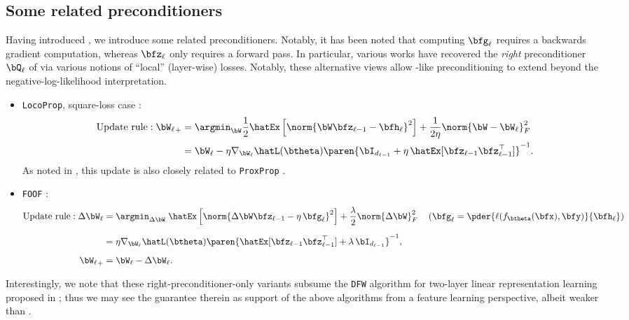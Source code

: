 \subsection*{Some related preconditioners}
Having introduced \KFAC, we introduce some related preconditioners. Notably, it has been noted that computing $\bfg_\ell$ requires a backwards gradient computation, whereas $\bfz_\ell$ only requires a forward pass. In particular, various works have recovered the \emph{right} preconditioner $\bQ_\ell$ of \KFAC via various notions of ``local'' (layer-wise) losses. Notably, these alternative views allow \KFAC-like preconditioning to extend beyond the negative-log-likelihood interpretation.
\begin{itemize}
    \item \texttt{LocoProp}, square-loss case \cite{amid2022locoprop}:
    \begin{align*}
        \text{Update rule}: {\bW_{\ell}}_+ &= \argmin_{\bW} \frac{1}{2}\hatEx\left[\norm{\bW \bfz_{\ell-1} - \bfh_\ell}^2\right] + \frac{1}{2\eta}\norm{\bW - \bW_\ell}_F^2 \\
        &= \bW_\ell - \eta \nabla_{\bW_\ell} \hatL(\btheta)\paren{\bI_{d_{\ell-1}} + \eta \,\hatEx[\bfz_{\ell-1} \bfz_{\ell-1}^\top]}^{-1}.
    \end{align*}
    As noted in \citet{amid2022locoprop}, this update is also closely related to \texttt{ProxProp} \cite{frerix2018proximal}.

    \item \texttt{FOOF} \cite{benzing2022gradient}:
    \begin{align*}
        \text{Update rule}: \Delta \bW_\ell &= \argmin_{\Delta \bW}\;\hatEx \left[\norm{\Delta \bW \bfz_{\ell-1} - \eta\, \bfg_\ell}^2\right] + \frac{\lambda}{2} \norm{\Delta \bW}_F^2 && \left(\bfg_\ell = \pder{\ell(f_{\btheta}(\bfx), \bfy)}{\bfh_\ell}\right) \\[0.2cm]
        &= \eta \nabla_{\bW_\ell} \hatL(\btheta) \paren{\hatEx[\bfz_{\ell-1} \bfz_{\ell-1}^\top] + \lambda\, \bI_{d_{\ell-1}}}^{-1}, \\[0.2cm]
        {\bW_{\ell}}_+ &= \bW_\ell - \Delta \bW_\ell.
    \end{align*}
\end{itemize}
Interestingly, we note that these right-preconditioner-only variants subsume the \texttt{DFW} algorithm for two-layer linear representation learning proposed in \citet{zhang2023meta}; thus we may see the guarantee therein as support of the above algorithms from a feature learning perspective, albeit weaker than .


